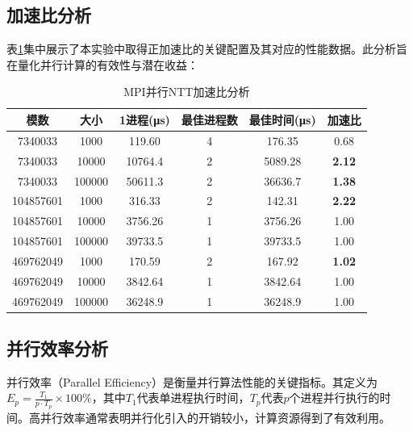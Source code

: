 \documentclass[a4paper]{article}
\begin{document}
\subsection{加速比分析}

表\ref{table:speedup_analysis}集中展示了本实验中取得正加速比的关键配置及其对应的性能数据。此分析旨在量化并行计算的有效性与潜在收益：

\begin{table}[!htbp]
  \centering
  \begin{tabular}{|c|c|c|c|c|c|}
  \hline
  \textbf{模数} & \textbf{大小} & \textbf{1进程(μs)} & \textbf{最佳进程数} & \textbf{最佳时间(μs)} & \textbf{加速比} \\
  \hline
  7340033 & 1000 & 119.60 & 4 & 176.35 & 0.68 \\
  7340033 & 10000 & 10764.4 & 2 & 5089.28 & \textbf{2.12} \\
  7340033 & 100000 & 50611.3 & 2 & 36636.7 & \textbf{1.38} \\
  \hline
  104857601 & 1000 & 316.33 & 2 & 142.31 & \textbf{2.22} \\
  104857601 & 10000 & 3756.26 & 1 & 3756.26 & 1.00 \\
  104857601 & 100000 & 39733.5 & 1 & 39733.5 & 1.00 \\
  \hline
  469762049 & 1000 & 170.59 & 2 & 167.92 & \textbf{1.02} \\
  469762049 & 10000 & 3842.64 & 1 & 3842.64 & 1.00 \\
  469762049 & 100000 & 36248.9 & 1 & 36248.9 & 1.00 \\
  \hline
  \end{tabular}
  \caption{MPI并行NTT加速比分析}
  \label{table:speedup_analysis}
\end{table}

\subsection{并行效率分析}

并行效率（Parallel Efficiency）是衡量并行算法性能的关键指标。其定义为$E_p = \frac{T_1}{p \cdot T_p} \times 100\%$，其中$T_1$代表单进程执行时间，$T_p$代表$p$个进程并行执行的时间。高并行效率通常表明并行化引入的开销较小，计算资源得到了有效利用。
\end{document}
